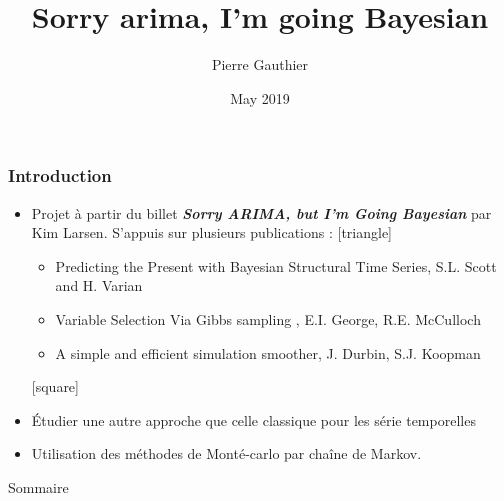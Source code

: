 \documentclass{presentation_template}
\author{Pierre Gauthier}
\title[Sorry ARIMA]{Sorry arima, I'm going Bayesian}
\institute[]{{\'Ecole des Mines de Nancy}}
\date{May 2019}
\begin{document}
{

}





 \begin{frame}
   \frametitle{Introduction}
   \begin{itemize}
      \item Projet à partir du billet \textbf{\textit{Sorry ARIMA, but I’m Going Bayesian}} par Kim Larsen.
        S'appuis sur plusieurs publications :
        [triangle]
        \vspace{0.2cm}
        \begin{itemize}
          \item Predicting the Present with Bayesian Structural Time Series, S.L. Scott and H. Varian
          \item Variable Selection Via Gibbs sampling , E.I. George, R.E. McCulloch
          \item A simple and efficient simulation smoother, J. Durbin, S.J. Koopman
        \end{itemize}
        \vspace{0.2cm}
        [square]
        \item \'Etudier une autre approche que celle classique pour les série temporelles
        \vspace{0.2cm}
      \item Utilisation des méthodes de Monté-carlo par chaîne de Markov.
   \end{itemize}
 
   
 
 \end{frame}
\begin{frame}{Sommaire}
\tableofcontents
\end{frame}
\end{document}
